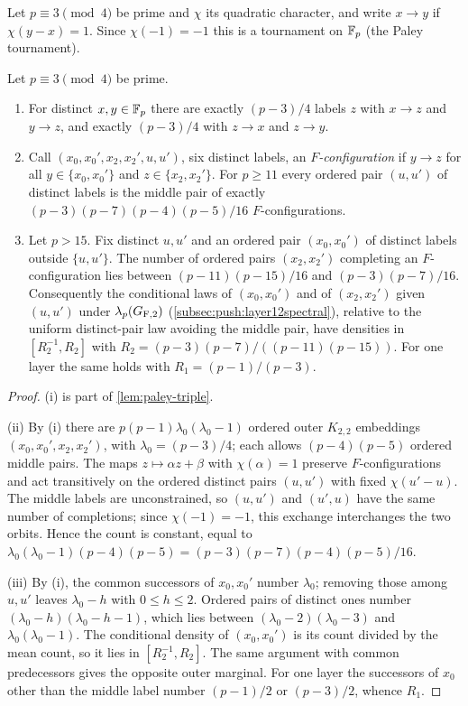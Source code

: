 Let $p\equiv3\pmod4$ be prime and $\chi$ its quadratic character, and write
$x\to y$ if $\chi(y-x)=1$. Since $\chi(-1)=-1$ this is a tournament on
$\mathbb F_p$ (the Paley tournament).

\begin{lemma}\label{lem:record:class-three}
Let $p\equiv3\pmod4$ be prime.
\begin{enumerate}[label=(\roman*)]
\item For distinct $x,y\in\mathbb F_p$ there are exactly $(p-3)/4$ labels $z$ with
 $x\to z$ and $y\to z$, and exactly $(p-3)/4$ with $z\to x$ and $z\to y$.
\item Call $(x_0,x_0',x_2,x_2',u,u')$, six distinct labels, an
 \emph{$F$-configuration} if $y\to z$ for all $y\in\{x_0,x_0'\}$ and
 $z\in\{x_2,x_2'\}$. For $p\ge11$ every ordered pair $(u,u')$ of distinct
 labels is the middle pair of exactly $(p-3)(p-7)(p-4)(p-5)/16$
 $F$-configurations.
\item Let $p>15$. Fix distinct $u,u'$ and an ordered pair $(x_0,x_0')$ of
 distinct labels outside $\{u,u'\}$. The number of ordered pairs
 $(x_2,x_2')$ completing an $F$-configuration lies between
 $(p-11)(p-15)/16$ and $(p-3)(p-7)/16$. Consequently the conditional laws
 of $(x_0,x_0')$ and of $(x_2,x_2')$ given $(u,u')$ under
 $\lambda_p(G_{\rm F,2})$ (\cref{subsec:push:layer12spectral}), relative to the uniform
 distinct-pair law avoiding the middle pair, have densities in
 $[R_2^{-1},R_2]$ with $R_2=(p-3)(p-7)/((p-11)(p-15))$. For one layer the
 same holds with $R_1=(p-1)/(p-3)$.
\end{enumerate}
\end{lemma}

\begin{proof}
(i) is part of \cref{lem:paley-triple}.

(ii) By (i) there are $p(p-1)\lambda_0(\lambda_0-1)$ ordered outer
$K_{2,2}$ embeddings $(x_0,x_0',x_2,x_2')$, with $\lambda_0=(p-3)/4$;
each allows $(p-4)(p-5)$ ordered middle pairs. The maps
$z\mapsto\alpha z+\beta$ with $\chi(\alpha)=1$ preserve $F$-configurations
and act transitively on the ordered distinct pairs $(u,u')$ with fixed
$\chi(u'-u)$. The middle labels are unconstrained, so $(u,u')$ and $(u',u)$
have the same number of completions; since $\chi(-1)=-1$, this exchange
interchanges the two orbits. Hence the count is constant, equal to
$\lambda_0(\lambda_0-1)(p-4)(p-5)=(p-3)(p-7)(p-4)(p-5)/16$.

(iii) By (i), the common successors of $x_0,x_0'$ number $\lambda_0$;
removing those among $u,u'$ leaves $\lambda_0-h$ with $0\le h\le2$. Ordered
pairs of distinct ones number $(\lambda_0-h)(\lambda_0-h-1)$, which lies
between $(\lambda_0-2)(\lambda_0-3)$ and $\lambda_0(\lambda_0-1)$. The
conditional density of $(x_0,x_0')$ is its count divided by the mean count,
so it lies in $[R_2^{-1},R_2]$. The same argument with common predecessors
gives the opposite outer marginal. For one layer the successors of $x_0$
other than the middle label number $(p-1)/2$ or $(p-3)/2$, whence $R_1$.
\end{proof}

